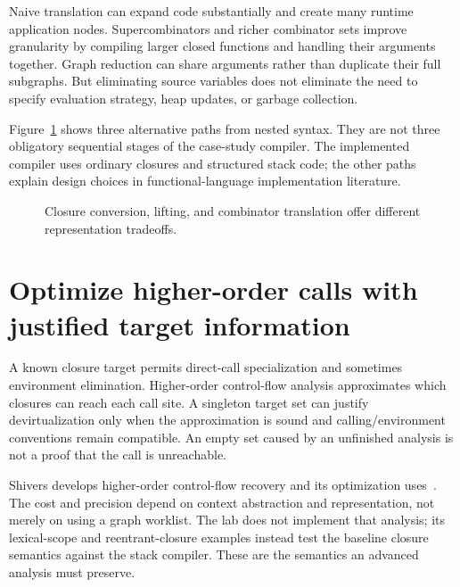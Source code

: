 Naive translation can expand code substantially and create many runtime application nodes.
Supercombinators and richer combinator sets improve granularity by compiling larger closed functions and handling their arguments together.
Graph reduction can share arguments rather than duplicate their full subgraphs.
But eliminating source variables does not eliminate the need to specify evaluation strategy, heap updates, or garbage collection.

Figure~\ref{fig:ch91-choices} shows three alternative paths from nested syntax.
They are not three obligatory sequential stages of the case-study compiler.
The implemented compiler uses ordinary closures and structured stack code; the other paths explain design choices in functional-language implementation literature.

\begin{figure}[htbp]
\centering
{}
\caption{Closure conversion, lifting, and combinator translation offer different representation tradeoffs.}
\label{fig:ch91-choices}
\end{figure}

\section{Optimize higher-order calls with justified target information}
\label{sec:ch91-analysis}
A known closure target permits direct-call specialization and sometimes environment elimination.
Higher-order control-flow analysis approximates which closures can reach each call site.
A singleton target set can justify devirtualization only when the approximation is sound and calling/environment conventions remain compatible.
An empty set caused by an unfinished analysis is not a proof that the call is unreachable.

Shivers develops higher-order control-flow recovery and its optimization uses~\cite{shivers-1991-control}.
The cost and precision depend on context abstraction and representation, not merely on using a graph worklist.
The lab does not implement that analysis; its lexical-scope and reentrant-closure examples instead test the baseline closure semantics against the stack compiler.
These are the semantics an advanced analysis must preserve.

